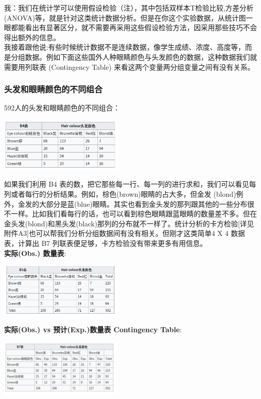 我：我们在统计学可以使用假设检验（注），其中包括双样本T检验比较,方差分析(ANOVA)等，就是针对这类统计数据分析。但是在你这个实验数据，从统计图一眼都能看出有显著区分，就不需要再采用这些假设检验方法，因采用那些技巧不会得出额外的信息。\\
我接着跟他说:有些时候统计数据不是连续数据，像学生成绩、浓度、高度等，而是分组数据。例如下面这些国外人种眼睛颜色与头发颜色的数据，这种数据我们就需要用列联表
(Contingency Table) 来看这两个变量两分组变量之间有没有关系。\\

\hypertarget{ux5934ux53d1ux548cux773cux775bux989cux8272ux7684ux4e0dux540cux7ec4ux5408}{%
\subsubsection{头发和眼睛颜色的不同组合}\label{ux5934ux53d1ux548cux773cux775bux989cux8272ux7684ux4e0dux540cux7ec4ux5408}}

592人的头发和眼睛颜色的不同组合：

\includegraphics[width=6cm]{Screenshotfrom2023-01-0222-19-18.png}

如果我们利用 B4
表的数，把它那些每一行、每一列的进行求和，我们可以看见每列或者每行的分析结果。例如，棕色(brown)眼睛的占大多，但金发
(blond)例外，金发的大部分是蓝(blue)眼睛。其实也看到金头发的那列跟其他的一些分布很不一样。比如我们看每行的话，也可以看到棕色眼睛跟蓝眼睛的数量差不多。但在金头发(blond)和黑头发(black)那列的分布就不一样了。统计分析的卡方检验{[}详见附件A3{]}也可以帮我们分析分组数据间有没有相关。但刚才这类简单4
X 4 数据表，计算出 B7 列联表便足够，卡方检验没有带来更多有用信息。\\
\textbf{实际(Obs.) 数量表}:

\includegraphics[width=6cm]{Screenshotfrom2023-01-0222-20-05.png}


\textbf{实际(Obs.) vs 预计(Exp.)数量表 Contingency Table}:

\includegraphics[width=6cm]{Screenshotfrom2023-01-0222-21-11.png}

